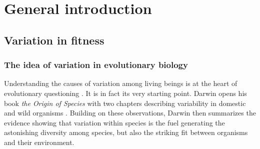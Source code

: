 
\chapter[\texorpdfstring{Chapter 1 --\\ General introduction}{Chapter 1 -- General introduction}]{General introduction}

\section{Variation in fitness}
\subsection{The idea of variation in evolutionary biology}
Understanding the causes of variation among living beings is at the heart of evolutionary questioning \parencite{Kruuk2014}. It is in fact its very starting point. Darwin opens his book \emph{the Origin of Species} with two chapters describing variability in domestic and wild organisms \parencite{Darwin1859}.
Building on these observations, Darwin then summarizes the evidence showing that variation within species is the fuel generating the astonishing diversity among species, but also the striking fit between organisms and their environment.


